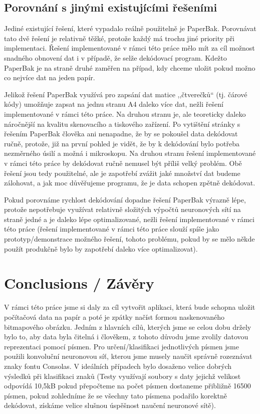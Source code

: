 \documentclass[conference]{IEEEtran}
\begin{document}
\subsection{Porovnání s jinými existujícími řešeními}

Jediné existující řešení, které vypadalo reálně použitelně je PaperBak. Porovnávat tato dvě řešení je relativně těžké, protože každý má trochu jiné priority při implementaci. Řešení implementované v rámci této práce mělo mít za cíl možnost snadného obnovení dat i v případě, že selže dekódovací program. Kdežto PaperBak je na straně druhé zaměřen na případ, kdy chceme uložit pokud možno co nejvíce dat na jeden papír. 

Jelikož řešení PaperBak využívá pro zapsání dat matice ,,čtverečků`` (tj. čárové kódy) umožňuje zapsat na jednu stranu A4 daleko více dat, nežli řešení implementované v rámci této práce. Na druhou stranu je, ale teoreticky daleko náročnější na kvalitu skenovacího a tiskového zařízení. Po vytištění stránky s řešením PaperBak člověka ani nenapadne, že by se pokoušel data dekódovat ručně, protože, již na první pohled je vidět, že by k dekódování bylo potřeba nezměrného úsilí a možná i mikroskopu. Na druhou stranu řešení implementované v rámci této práce by dekódovat ručně nemusel být příliš velký problém. Obě řešení jsou tedy použitelné, ale je zapotřebí zvážit jaké množství dat budeme zálohovat, a jak moc důvěřujeme programu, že je data schopen zpětně dekódovat. 

Pokud porovnáme rychlost dekódování dopadne řešení PaperBak výrazně lépe, protože nepotřebuje využívat relativně složitých výpočtů neuronových sítí na straně jedné a je daleko lépe optimalizované, nežli řešení implementované v rámci této práce (řešení implementované v rámci této práce slouží spíše jako prototyp/demonstrace možného řešení, tohoto problému, pokud by se mělo někde použít produkčně bylo by zapotřebí daleko více optimalizovat).

\section{Conclusions / Závěry}

V rámci této práce jsme si daly za cíl vytvořit aplikaci, která bude schopna uložit počítačová data na papír a poté je zpátky načíst formou naskenovaného bitmapového obrázku. Jedním z hlavních cílů, kterých jsme se celou dobu držely bylo to, aby data byla čitelná i člověkem, z tohoto důvodu jsme zvolily datovou reprezentaci pomocí písmen. Pro určení/klasifikaci jednotlivých písmen jsme použili konvoluční neuronovou síť, kterou jsme musely naučit správně rozeznávat znaky fontu Consolas. V ideálních případech bylo dosaženo velice dobrých výsledků při klasifikaci znaků (Testy využívají soubory s daty jejichž velikost odpovídá 10,5kB pokud přepočteme na počet písmen dostaneme přibližně 16500 písmen, pokud zohledníme že se všechny tato písmena podařilo korektně dekódovat, získáme velice slušnou úspěšnost naučení neuronové sítě). 
\end{document}
